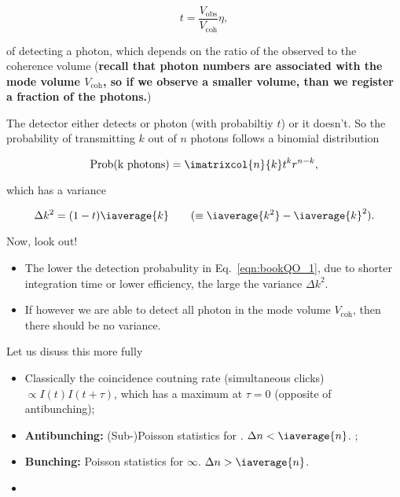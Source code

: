   \begin{equation}\label{eqn:bookQO_1}
  	t = \frac{V_\text{obs}}{V_\text{coh}}\eta,
  \end{equation}
  
  \noindent of detecting a photon, which depends on the ratio of the observed to the coherence volume (\textbf{recall that photon numbers are associated with the mode volume $ V_\text{coh} $, so if we observe a smaller volume, than we register a fraction of the photons.})
  
  The detector either detects or photon (with probabiltiy $ t $) or it doesn't. So the probability of transmitting $ k $ out of $ n $ photons follows a binomial distribution
  
  \begin{equation}\label{key}
  	\text{Prob(k photons)} = \imatrixcol{n}{k}t^{k}r^{n-k},
  \end{equation}
  
  \noindent which has a variance
  
  \begin{equation}\label{key}
  	\Delta k^2 = (1-t)\iaverage{k} \qquad (\equiv \iaverage{k^2} - \iaverage{k}^2).
  \end{equation}
  
  \noindent Now, look out!
  \begin{itemize}
  	\item The lower the detection probabulity in Eq.~\eqref{eqn:bookQO_1}, due to shorter integration time or lower efficiency, the large the variance $ \Delta k^2 $.
  	\item If however we are able to detect all photon in the mode volume $ V_\text{coh} $, then there should be no variance.
  \end{itemize}

 
 Let us disuss this more fully
 \begin{itemize}
 	\item Classically the coincidence coutning rate (simultaneous clicks) $ \propto I(t)I(t+\tau) $, which has a maximum at $ \tau = 0 $ (opposite of antibunching);
 	\item \textbf{Antibunching:} (Sub-)Poisson statistics for  . $ \Delta n < \iaverage{n}$. ;
 	\item \textbf{Bunching:} Poisson statistics for  \ra $ \infty $. $ \Delta n > \iaverage{n} $.
 	\item 
 \end{itemize}

